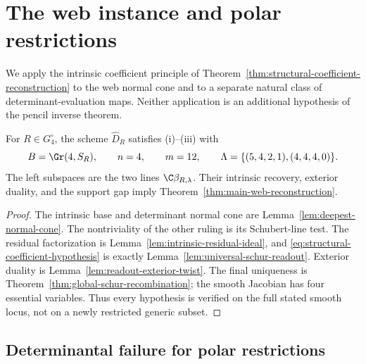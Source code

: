 \section{The web instance and polar restrictions}
\label{sec:web-polar-v143}
We apply the intrinsic coefficient principle of
Theorem~\ref{thm:structural-coefficient-reconstruction} to the web
normal cone and to a separate natural class of determinant-evaluation
maps.  Neither application is an additional hypothesis of the pencil
inverse theorem.

\begin{corollary}
\label{cor:structural-web-instance}
For \(R\in G_4^\circ\), the scheme \(\widehat D_R\) satisfies
\textup{(i)--(iii)} with
\[
 B=\Gr(4,S_R),\qquad n=4,\qquad m=12,\qquad
 \Lambda=\{(5,4,2,1),(4,4,4,0)\}.
\]
The left subspaces are the two lines
\(\C\beta_{R,\lambda}\).  Their intrinsic recovery, exterior
duality, and the support gap imply Theorem~\ref{thm:main-web-reconstruction}.
\end{corollary}
\begin{proof}
The intrinsic base and determinant normal cone are
Lemma~\ref{lem:deepest-normal-cone}.  The nontriviality of the other
ruling is its Schubert-line test.  The residual factorization is
Lemma~\ref{lem:intrinsic-residual-ideal}, and
\eqref{eq:structural-coefficient-hypothesis} is exactly
Lemma~\ref{lem:universal-schur-readout}.  Exterior duality is
Lemma~\ref{lem:readout-exterior-twist}.  The final uniqueness is
Theorem~\ref{thm:global-schur-recombination}; the smooth Jacobian
has four essential variables.  Thus every hypothesis is verified on
the full stated smooth locus, not on a newly restricted generic subset.
\end{proof}

\subsection{Determinantal failure for polar restrictions}

